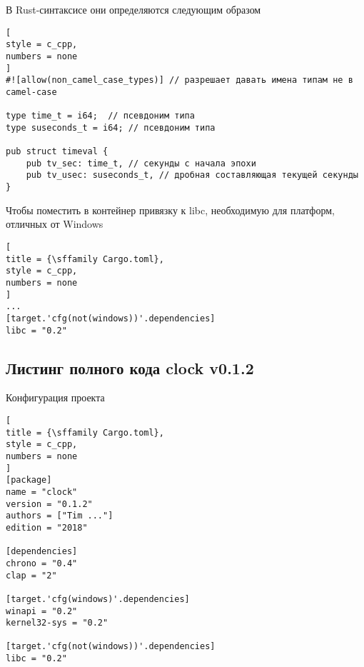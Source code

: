 \documentclass[%
	11pt,
	a4paper,
	utf8,
		]{article}
\begin{document}
В Rust-синтаксисе они определяются следующим образом
\begin{lstlisting}[
style = c_cpp,
numbers = none
]
#![allow(non_camel_case_types)] // разрешает давать имена типам не в camel-case

type time_t = i64;  // псевдоним типа
type suseconds_t = i64; // псевдоним типа

pub struct timeval {
    pub tv_sec: time_t, // секунды с начала эпохи
    pub tv_usec: suseconds_t, // дробная составляющая текущей секунды
}
\end{lstlisting}

Чтобы поместить в контейнер привязку к libc, необходимую для платформ, отличных от Windows
\begin{lstlisting}[
title = {\sffamily Cargo.toml},
style = c_cpp,
numbers = none
]
...
[target.'cfg(not(windows))'.dependencies]
libc = "0.2"
\end{lstlisting}

\subsection{Листинг полного кода clock v0.1.2}

Конфигурация проекта
\begin{lstlisting}[
title = {\sffamily Cargo.toml},
style = c_cpp,
numbers = none
]
[package]
name = "clock"
version = "0.1.2"
authors = ["Tim ..."]
edition = "2018"

[dependencies]
chrono = "0.4"
clap = "2"

[target.'cfg(windows)'.dependencies]
winapi = "0.2"
kernel32-sys = "0.2"

[target.'cfg(not(windows))'.dependencies]
libc = "0.2"
\end{lstlisting}
\end{document}
